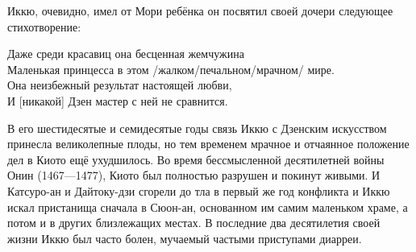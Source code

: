 \begin{ver}
  Иккю, очевидно, имел от Мори ребёнка он посвятил своей дочери
  следующее стихотворение:
\end{ver}

\begin{ver}
  Даже среди красавиц она бесценная жемчужина\\
  Маленькая принцесса в этом /жалком/печальном/мрачном/ мире.\\
  Она неизбежный результат настоящей любви,\\
  И [никакой] Дзен мастер с ней не сравнится.
\end{ver}

\begin{ver}
  В его шестидесятые и семидесятые годы связь Иккю с Дзенским
  искусством принесла великолепные плоды, но тем временем мрачное и
  отчаянное положение дел в Киото ещё ухудшилось. Во
  время бессмысленной десятилетней войны Онин (1467---1477), Киото был
  полностью разрушен и покинут живыми.
  И Катсуро-ан и Дайтоку-дзи сгорели до тла в первый же год конфликта
  и Иккю искал пристанища сначала в Сюон-ан, основанном им самим
  маленьком храме, а потом и в других близлежащих местах. В последние
  два десятилетия своей жизни Иккю был часто болен, мучаемый частыми
  приступами диарреи.
\end{ver}
